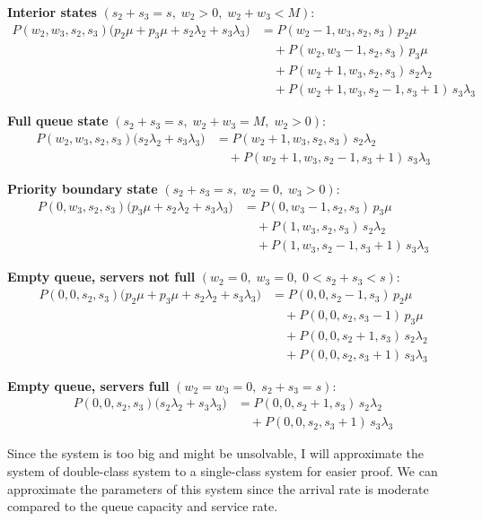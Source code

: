 \documentclass{article}
\begin{document}
\textbf{Interior states} $(s_2+s_3=s,\; w_2>0,\; w_2+w_3<M)$:
\begin{align*}
P(w_2,w_3,s_2,s_3)
\big(
p_2\mu + p_3\mu + s_2\lambda_2 + s_3\lambda_3
\big)
&=
P(w_2-1,w_3,s_2,s_3)\,p_2\mu
\\
&\quad+
P(w_2,w_3-1,s_2,s_3)\,p_3\mu
\\
&\quad+
P(w_2+1,w_3,s_2,s_3)\,s_2\lambda_2
\\
&\quad+
P(w_2+1,w_3,s_2-1,s_3+1)\,s_3\lambda_3
\end{align*}

\textbf{Full queue state} $(s_2+s_3=s,\; w_2+w_3=M,\; w_2>0)$:
\begin{align*}
P(w_2,w_3,s_2,s_3)
\big(
s_2\lambda_2 + s_3\lambda_3
\big)
&=
P(w_2+1,w_3,s_2,s_3)\,s_2\lambda_2
\\
&\quad+
P(w_2+1,w_3,s_2-1,s_3+1)\,s_3\lambda_3
\end{align*}

\textbf{Priority boundary state} $(s_2+s_3=s,\; w_2=0,\; w_3>0)$:
\begin{align*}
P(0,w_3,s_2,s_3)
\big(
p_3\mu + s_2\lambda_2 + s_3\lambda_3
\big)
&=
P(0,w_3-1,s_2,s_3)\,p_3\mu
\\
&\quad+
P(1,w_3,s_2,s_3)\,s_2\lambda_2
\\
&\quad+
P(1,w_3,s_2-1,s_3+1)\,s_3\lambda_3
\end{align*}

\textbf{Empty queue, servers not full} $(w_2 = 0,\; w_3 = 0,\; 0 < s_2 + s_3 < s)$:
\begin{align*}
P(0,0,s_2,s_3)
\big(
p_2\mu + p_3\mu + s_2\lambda_2 + s_3\lambda_3
\big)
&=
P(0,0,s_2-1,s_3)\,p_2\mu
\\
&\quad+
P(0,0,s_2,s_3-1)\,p_3\mu
\\
&\quad+
P(0,0,s_2+1,s_3)\,s_2\lambda_2
\\
&\quad+
P(0,0,s_2,s_3+1)\,s_3\lambda_3
\end{align*}


\textbf{Empty queue, servers full} $(w_2=w_3=0,\; s_2+s_3=s)$:
\begin{align*}
P(0,0,s_2,s_3)
\big(
s_2\lambda_2 + s_3\lambda_3
\big)
&=
P(0,0,s_2+1,s_3)\,s_2\lambda_2
\\
&\quad+
P(0,0,s_2,s_3+1)\,s_3\lambda_3
\end{align*}

Since the system is too big and might be unsolvable, I will approximate the system of double-class system to a single-class system for easier proof. We can approximate the parameters of this system since the arrival rate is moderate compared to the queue capacity and service rate.\\
\end{document}
